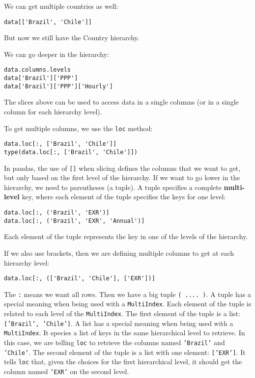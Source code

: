 \documentclass[12pt, a4paper]{article}
\begin{document}
We can get multiple countries as well:
\lstset{language=jupyter-python,label= ,caption= ,captionpos=b,numbers=none}
\begin{lstlisting}
data[['Brazil', 'Chile']]
\end{lstlisting}
But now we still have the Country hierarchy.

We can go deeper in the hierarchy:
\lstset{language=jupyter-python,label= ,caption= ,captionpos=b,numbers=none}
\begin{lstlisting}
data.columns.levels
data['Brazil']['PPP']
data['Brazil']['PPP']['Hourly']
\end{lstlisting}
The slices above can be used to access data in a single columns (or in a single column for each hierarchy level).

To get multiple columns, we use the \texttt{loc} method:
\lstset{language=jupyter-python,label= ,caption= ,captionpos=b,numbers=none}
\begin{lstlisting}
data.loc[:, ['Brazil', 'Chile']]
type(data.loc[:, ['Brazil', 'Chile']])
\end{lstlisting}

In pandas, the use of \texttt{[]} when slicing defines the columns that we want to get, but only based on the first level of the hierarchy.
If we want to go lower in the hierarchy, we need to parentheses (a tuple).
A tuple specifies a complete \textbf{\textbf{multi-level}} key, where each element of the tuple specifies the keys for one level:
\lstset{language=jupyter-python,label= ,caption= ,captionpos=b,numbers=none}
\begin{lstlisting}
data.loc[:, ('Brazil', 'EXR')]
data.loc[:, ('Brazil', 'EXR', 'Annual')]
\end{lstlisting}
Each element of the tuple represents the key in one of the levels of the hierarchy.

If we also use brackets, then we are defining multiple columns to get at each hierarchy level:
\lstset{language=jupyter-python,label= ,caption= ,captionpos=b,numbers=none}
\begin{lstlisting}
data.loc[:, (['Brazil', 'Chile'], ['EXR'])]
\end{lstlisting}
The \texttt{:} means we want all rows.
Then we have a big tuple \texttt{( .... )}.
A tuple has a special meaning when being used with a \texttt{MultiIndex}.
Each element of the tuple is related to each level of the \texttt{MultiIndex}.
The first element of the tuple is a list: \texttt{['Brazil', 'Chile']}.
A list has a special meaning when being used with a \texttt{MultiIndex}.
It species a list of keys in the same hierarchical level to retrieve.
In this case, we are telling \texttt{loc} to retrieve the columns named \texttt{'Brazil'} and \texttt{'Chile'}.
The second element of the tuple is a list with one element: \texttt{['EXR']}.
It tells \texttt{loc} that, given the choices for the first hierarchical level, it should get the column named \texttt{'EXR'} on the second level.
\end{document}
